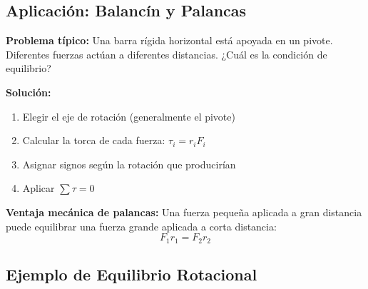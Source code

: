 \subsection{Aplicación: Balancín y Palancas}

\begin{seccion}
\textbf{Problema típico:} Una barra rígida horizontal está apoyada en un pivote. Diferentes fuerzas actúan a diferentes distancias. ¿Cuál es la condición de equilibrio?

\textbf{Solución:}
\begin{enumerate}
    \item Elegir el eje de rotación (generalmente el pivote)
    \item Calcular la torca de cada fuerza: $\tau_i = r_i F_i$
    \item Asignar signos según la rotación que producirían
    \item Aplicar $\sum \tau = 0$
\end{enumerate}

\textbf{Ventaja mecánica de palancas:} Una fuerza pequeña aplicada a gran distancia puede equilibrar una fuerza grande aplicada a corta distancia:
$$F_1 r_1 = F_2 r_2$$
\end{seccion}

\subsection{Ejemplo de Equilibrio Rotacional}

\begin{center}
\shorthandoff{>}\shorthandoff{<}
\shorthandon{>}\shorthandon{<}
\end{center}

